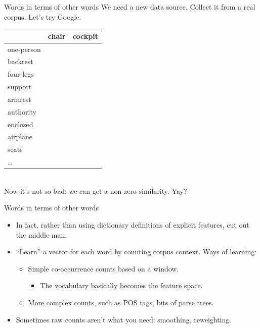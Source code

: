 \documentclass[xcolor=pdftex,x11names,table,hyperref]{beamer}
\begin{document}
\begin{frame}{Words in terms of other words}
  We need a new data source.  Collect it from a real corpus.  Let's try Google.\\\pause
  {\small
  \begin{tabular}{|l|l|l|}
    \hline
    & chair & cockpit \\
    \hline
    one-person &  &  \\
    backrest &  &  \\
    four-legs &  &  \\
    support &  &  \\
    armrest &  &  \\
    authority &  & \\
    enclosed &  & \\
    airplane & &  \\
    seats &  &  \\
    \ldots &&\\
    \hline
  \end{tabular}
  }\pause\\
  Now it's not so bad: we can get a non-zero similarity.  Yay?
\end{frame}

\begin{frame}{Words in terms of other words}
  \begin{itemize}
  \item In fact, rather than using dictionary definitions of explicit features,
    cut out the middle man.\pause
  \item ``Learn'' a vector for each word by counting corpus context. Ways of learning:
    \begin{itemize}
    \item Simple co-occurrence counts based on a window.
      \begin{itemize}
      \item The vocabulary basically becomes the feature space.
      \end{itemize}\pause
    \item More complex counts, such as POS tags, bits of parse trees.\pause
    \end{itemize}
  \item Sometimes raw counts aren't what you need: smoothing, reweighting.
  \end{itemize}
\end{frame}
\end{document}
